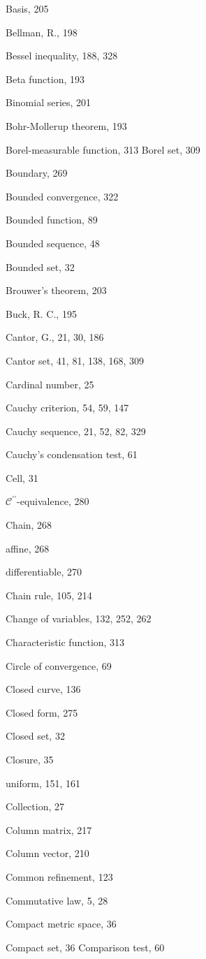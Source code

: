 \documentclass[10pt]{article}
\begin{document}
Basis, 205

Bellman, R., 198

Bessel inequality, 188, 328

Beta function, 193

Binomial series, 201

Bohr-Mollerup theorem, 193

Borel-measurable function, 313
Borel set, 309

Boundary, 269

Bounded convergence, 322

Bounded function, 89

Bounded sequence, 48

Bounded set, 32

Brouwer's theorem, 203

Buck, R. C., 195

Cantor, G., 21, 30, 186

Cantor set, 41, 81, 138, 168, 309

Cardinal number, 25

Cauchy criterion, 54, 59, 147

Cauchy sequence, 21, 52, 82, 329

Cauchy's condensation test, 61

Cell, 31

$\mathscr{C}^{\prime \prime}$-equivalence, 280

Chain, 268

affine, 268

differentiable, 270

Chain rule, 105, 214

Change of variables, 132, 252, 262

Characteristic function, 313

Circle of convergence, 69

Closed curve, 136

Closed form, 275

Closed set, 32

Closure, 35

uniform, 151, 161

Collection, 27

Column matrix, 217

Column vector, 210

Common refinement, 123

Commutative law, 5, 28

Compact metric space, 36

Compact set, 36
Comparison test, 60
\end{document}
